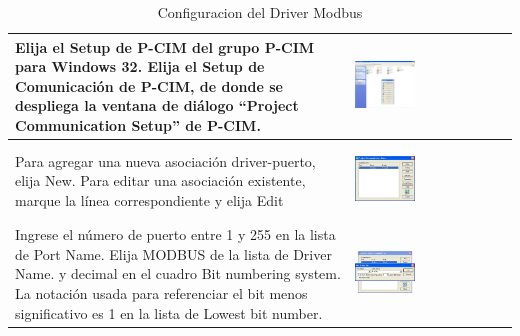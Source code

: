 \begin{itemize}
\begin{table}[ht]
\begin{tabular}{*{2}{m{}}}
  \hline
    Elija el Setup de P-CIM del grupo P-CIM para Windows 32.
    Elija el Setup de Comunicación de P-CIM, de donde se despliega la ventana 
    de diálogo ``Project Communication Setup'' de P-CIM.
    &\begin{center}
      \includegraphics[width=0.4\textwidth]
	{Cap5-SCADA/images/SetupPCIM.JPG}
    \end{center}\\
  \hline
    Para agregar una nueva asociación driver-puerto, elija New.
    Para editar una asociación existente, marque la línea correspondiente
    y elija Edit
    &\begin{center}
       \includegraphics[width=0.4\textwidth]
	{Cap5-SCADA/images/commSetup.jpeg}
    \end{center}\\
  \hline
    Ingrese el número de puerto entre 1 y 255 en la lista de Port Name.
    Elija MODBUS de la lista de Driver Name.
    y decimal en el cuadro Bit numbering system.
    La notación usada para referenciar el bit menos significativo es 1 en 
    la lista de Lowest bit number.
    &\begin{center}
       \includegraphics[width=0.4\textwidth]
	{Cap5-SCADA/images/portProp.jpeg}
    \end{center}\\
  \hline
  \end{tabular}
  \caption{Configuracion del Driver Modbus}
  \label{tab:ConfigModbus}
  \end{table}
 

\end{itemize}
